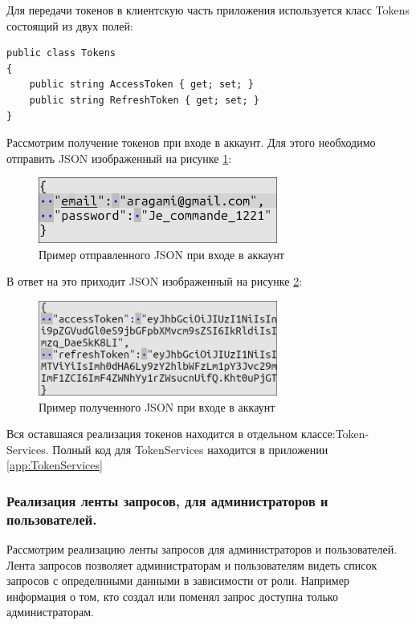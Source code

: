 Для передачи токенов в клиентскую часть приложения используется класс Tokens состоящий из двух полей:

\begin{verbatim}
public class Tokens
{
    public string AccessToken { get; set; }
    public string RefreshToken { get; set; }
}
\end{verbatim}

Рассмотрим получение токенов при входе в аккаунт. Для этого необходимо отправить JSON изображенный на рисунке \ref{fig:LoginInput}:

\begin{figure}[!h]
    \centering
    \includegraphics[width = 0.7\textwidth]{imgs/LoginInput.png}
    \caption{Пример отправленного JSON при входе в аккаунт}
    \label{fig:LoginInput}
\end{figure}

В ответ на это приходит JSON изображенный на рисунке \ref{fig:LoginOutput}:

\newpage
\begin{figure}[!h]
    \centering
    \includegraphics[width = 0.7\textwidth]{imgs/LoginOutput.png}
    \caption{Пример полученного JSON при входе в аккаунт}
    \label{fig:LoginOutput}
\end{figure}

Вся оставшаяся реализация токенов находится в отдельном классе:Token- Services. Полный код для TokenServices находится в приложении \ref{app:TokenServices}

\subsubsection{Реализация ленты запросов, для администраторов и пользователей.}

Рассмотрим реализацию ленты запросов для администраторов и пользователей. Лента запросов позволяет администраторам и пользователям видеть список запросов с определнными данными в зависимости от роли. Например информация о том, кто создал или поменял запрос доступна только администраторам.

